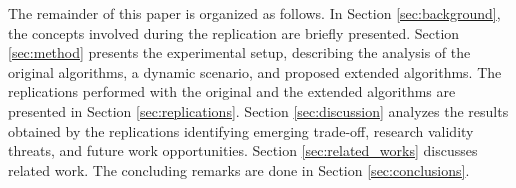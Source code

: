 The remainder of this paper is organized as follows. In Section \ref{sec:background}, the concepts involved during the replication are briefly presented. Section \ref{sec:method} presents the experimental setup, describing the analysis of the original algorithms, a dynamic scenario, and proposed extended algorithms. The replications performed with the original and the extended algorithms are presented in Section \ref{sec:replications}. Section \ref{sec:discussion} analyzes the results obtained by the replications identifying emerging trade-off, research validity threats, and future work opportunities. Section \ref{sec:related_works} discusses related work. The concluding remarks are done in Section \ref{sec:conclusions}.